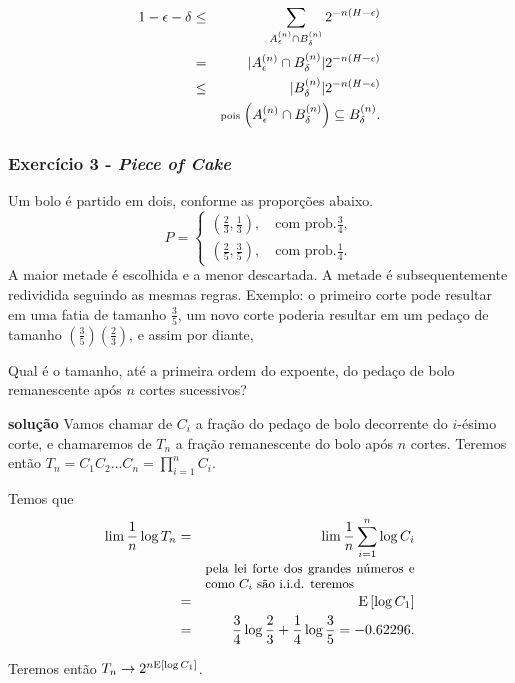 \begin{frame}[allowframebreaks]
\begin{exercise}
  \exercisebreak

  \begin{eqnarray}
  1 - \epsilon - \delta &\leq& \sum_{A_{\epsilon}^{(n)} \cap B_{\delta}^{(n)}} 2^{-n(H-\epsilon)} \nonumber \\
		&=& \vert A_{\epsilon}^{(n)} \cap B_{\delta}^{(n)}  \vert 2^{-n(H-\epsilon)} \nonumber \\
		&\leq& \vert B_{\delta}^{(n)}  \vert 2^{-n(H-\epsilon)} \nonumber \\
		&& \text{\scriptsize pois } { \small  \left( A_{\epsilon}^{(n)} \cap B_{\delta}^{(n)} \right) \subseteq B_{\delta}^{(n)}} .
  \end{eqnarray}


  \end{exercise}
\end{frame}


\begin{frame}[allowframebreaks]
  \frametitle{Exercício 3 - \textit{Piece of Cake}}
  \begin{exercise}
  Um bolo é partido em dois, conforme as proporções abaixo. 
  \begin{equation}
  P = \begin{cases} \left( \frac{2}{3}, \frac{1}{3} \right), \quad \text{com prob.} \frac{3}{4} , \\
	\left( \frac{2}{5}, \frac{3}{5} \right), \quad \text{com prob.} \frac{1}{4} .
	\end{cases}
  \end{equation}
  A maior metade é escolhida e a menor descartada. A metade é subsequentemente redividida seguindo as
  mesmas regras. Exemplo: o primeiro corte pode resultar em uma fatia de tamanho $\frac{3}{5}$,
  um novo corte poderia resultar em um pedaço de tamanho $\left(\frac{3}{5}\right) \left(\frac{2}{3}\right)$,
  e assim por diante, 

  Qual é o tamanho, até a primeira ordem do expoente, do pedaço de bolo remanescente após $n$ cortes sucessivos?


  \exercisebreak
  \textbf{solução}
  Vamos chamar de $C_i$ a fração do pedaço de bolo decorrente do $i$-ésimo corte, e chamaremos 
  de $T_n$ a fração remanescente do bolo após $n$ cortes. Teremos então $T_n = C_1 C_2 \ldots C_n = \prod_{i=1}^{n} C_i$.

  Temos que
  \vspace{-2em}
  \begin{eqnarray}
  \lim \frac{1}{n} \log T_n &=& \lim \frac{1}{n} \sum_{i=1}^{n} \log C_i \nonumber \\
	&& \parbox{15em}{\small{pela lei forte dos grandes números e como $C_i$ são i.i.d. teremos}} \nonumber \\
	&=& \E \left[ \log C_1 \right] \nonumber \\
	&=& \frac{3}{4} \log \frac{2}{3} + \frac{1}{4} \log \frac{3}{5} = -0.62296.
  \end{eqnarray}

  Teremos então $ T_n \rightarrow 2^{n \mathrm{E} \left[ \log C_1 \right]} $.

  \end{exercise}
\end{frame}


